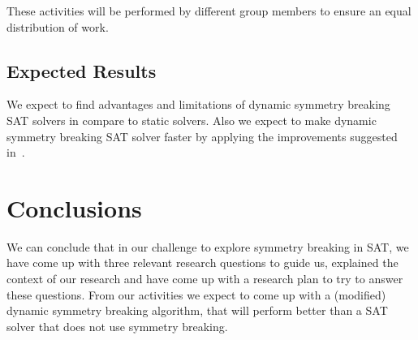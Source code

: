 			These activities will be performed by different group members to ensure an equal distribution of work.

		\subsection{Expected Results}
			We expect to find advantages and limitations of dynamic symmetry breaking SAT solvers in compare to static solvers.
			Also we expect to make dynamic symmetry breaking SAT solver faster by applying the improvements suggested in~\cite{devriendt2012symmetry}.

	\section{Conclusions}
		We can conclude that in our challenge to explore symmetry breaking in SAT, we have come up with three relevant research questions to guide us, explained the context of our research and have come up with a research plan to try to answer these questions. From our activities we expect to come up with a (modified) dynamic symmetry breaking algorithm, that will perform better than a SAT solver that does not use symmetry breaking.

	
	



